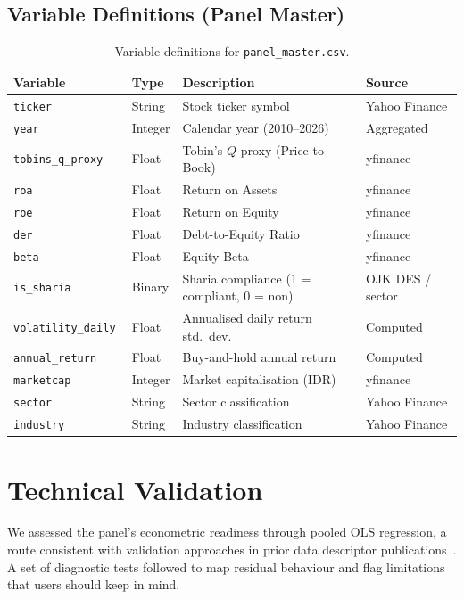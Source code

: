 \documentclass[11pt,a4paper]{article}
\begin{document}
\subsection{Variable Definitions (Panel Master)}

\begin{table}[H]
\centering
\caption{Variable definitions for \texttt{panel\_master.csv}.}
\label{tab:variables}
\begin{tabular}{l l p{5cm} p{2.5cm}}
\toprule
\textbf{Variable} & \textbf{Type} & \textbf{Description} & \textbf{Source} \\
\midrule
\tt ticker           & String  & Stock ticker symbol & Yahoo Finance \\
\tt year             & Integer & Calendar year (2010--2026) & Aggregated \\
\tt tobins\_q\_proxy & Float   & Tobin's $Q$ proxy (Price-to-Book) & yfinance \\
\tt roa              & Float   & Return on Assets & yfinance \\
\tt roe              & Float   & Return on Equity & yfinance \\
\tt der              & Float   & Debt-to-Equity Ratio & yfinance \\
\tt beta             & Float   & Equity Beta & yfinance \\
\tt is\_sharia       & Binary  & Sharia compliance (1 = compliant, 0 = non) & OJK DES / sector \\
\tt volatility\_daily & Float  & Annualised daily return std.\ dev. & Computed \\
\tt annual\_return   & Float   & Buy-and-hold annual return & Computed \\
\tt marketcap        & Integer & Market capitalisation (IDR) & yfinance \\
\tt sector           & String  & Sector classification & Yahoo Finance \\
\tt industry         & String  & Industry classification & Yahoo Finance \\
\bottomrule
\end{tabular}
\end{table}

\section{Technical Validation}

We assessed the panel's econometric readiness through pooled OLS regression, a route consistent with validation approaches in prior data descriptor publications~\cite{bessonova2025}. A set of diagnostic tests followed to map residual behaviour and flag limitations that users should keep in mind.
\end{document}
